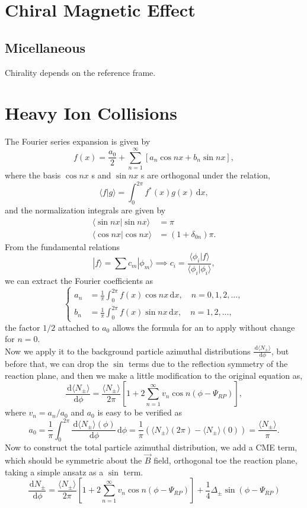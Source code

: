 \documentclass{article}
\newcommand{\be}{\begin{equation}}
\newcommand{\ee}{\end{equation}}
\newcommand{\bs}{\be\begin{split}}
\newcommand{\dif}{\,\mathrm{d}}
\newcommand{\1}{\left}
\newcommand{\2}{\right}
\begin{document}
\section{Chiral Magnetic Effect}

\subsection{Micellaneous}
Chirality depends on the reference frame.

\section{Heavy Ion Collisions}
The Fourier series expansion is given by
\be
f(x)=\frac{a_0}{2} +\sum_{n=1}^{\infty}\1[a_n \cos nx +b_n \sin nx\2],
\ee
where the basis $\cos nx$ s and $\sin nx$ s are orthogonal under the relation,
\be
\langle f|g\rangle =\int_0^{2\pi} f^*(x) g(x) \dif x,
\ee
and the normalization integrals are given by
\bs
\langle \sin nx|\sin nx\rangle &=\pi \\
\langle \cos nx|\cos nx\rangle &= (1+\delta_{0n})\pi.
\end{split}\ee
From the fundamental relations
\be
|f\rangle=\sum c_m|\phi_m\rangle \implies c_i=\frac{\langle\phi_i|f\rangle}{\langle\phi_i|\phi_i\rangle},
\ee
we can extract the Fourier coefficients as
\be\1\{\begin{split}
a_n&=\frac 1 \pi \int_0^{2\pi} f(x) \cos nx \dif x, \quad n=0, 1, 2,...,\\
b_n&=\frac 1 \pi \int_0^{2\pi} f(x) \sin nx \dif x, \quad n=1, 2,...,
\end{split}\2.\ee
the factor $1/2$ attached to $a_0$ allows the formula for an to apply without change for $n = 0$.\\

Now we apply it to the background particle azimuthal distributions $\frac{\dif \langle N_\pm\rangle}{\dif \phi}$, but before that, we can drop the $\sin$ terms due to the reflection symmetry of the reaction plane, and then we make a little modification to the original equation as,
\be
\frac{\dif \langle N_\pm\rangle}{\dif\phi}= \frac{\langle N_\pm\rangle}{2\pi}\1[1 + 2 \sum_{n=1}^{\infty} v_n \cos n(\phi-\Psi_{RP}) \2],
\ee
where $v_n=a_n/a_0$ and $a_0$ is easy to be verified as
\be
a_0=\frac 1 \pi \int_0^{2\pi} \frac{\dif \langle N_\pm\rangle(\phi)}{\dif\phi} \dif \phi =\frac 1 \pi (\langle N_\pm\rangle(2\pi)-\langle N_\pm\rangle(0)) =\frac {\langle N_\pm\rangle} \pi.
\ee
Now to construct the total particle azimuthal distribution, we add a CME term, which should be symmetric about the $\vec B$ field, orthogonal toe the reaction plane, taking a simple ansatz as a $\sin$ term.
\be
\frac{\dif N_\pm}{\dif\phi}= \frac{\langle N_\pm\rangle}{2\pi}\1[1 + 2 \sum_{n=1}^{\infty} v_n \cos n(\phi-\Psi_{RP}) \2] + \frac1 4 \Delta_\pm \sin(\phi-\Psi_{RP})
\ee
\end{document}
